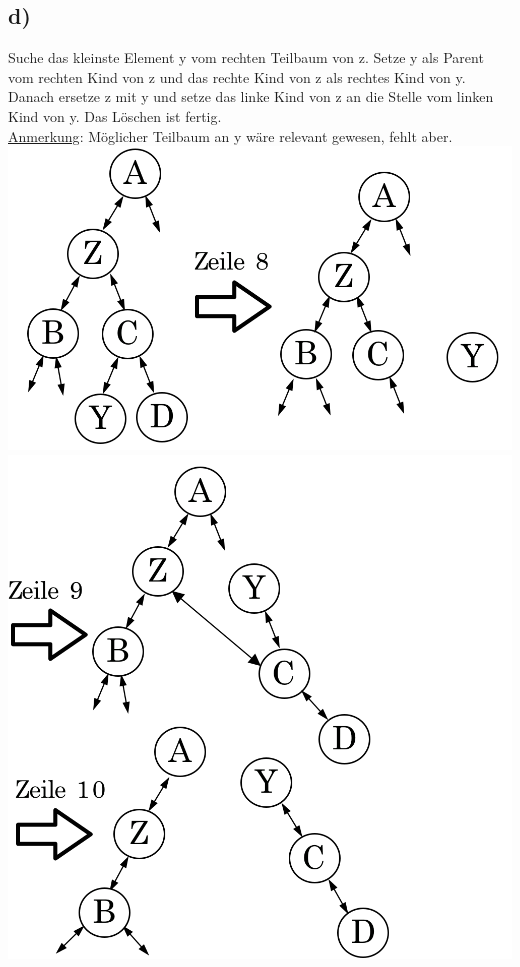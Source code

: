\documentclass[a4paper,11pt,twoside]{article}
\begin{document}
\subsection*{d)} Suche das kleinste Element y vom rechten Teilbaum von z. Setze y als Parent vom rechten Kind von z und das rechte Kind von z als rechtes Kind von y. Danach ersetze z mit y und setze das linke Kind von z an die Stelle vom linken Kind von y. Das Löschen ist fertig. \\
\underline{Anmerkung}: Möglicher Teilbaum an y wäre relevant gewesen, fehlt aber. \\
\includegraphics*[scale=0.2]{Images/D_step_1.png} \\
\includegraphics*[scale=0.2]{Images/D_step_2.png} \\
\end{document}
